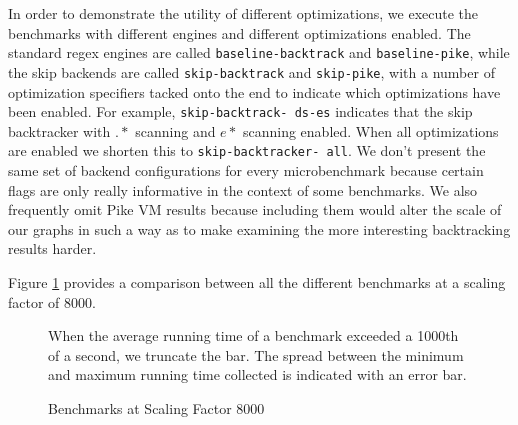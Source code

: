In order to demonstrate the utility of different optimizations,
we execute the benchmarks with different engines and different
optimizations enabled. The standard regex engines are called
\texttt{baseline\allowbreak -\allowbreak backtrack} and
\texttt{baseline\allowbreak -\allowbreak pike}, while the
skip backends are called \texttt{skip\allowbreak -\allowbreak backtrack}
and \texttt{skip\allowbreak -\allowbreak pike},
with a number of optimization specifiers tacked onto the end to
indicate which optimizations have been enabled. For example,
\texttt{skip\allowbreak -\allowbreak backtrack\allowbreak -\allowbreak
        ds\allowbreak -\allowbreak es}
indicates that the skip backtracker with $.*$ scanning and $e*$ scanning
enabled. When all optimizations are enabled we shorten this to
\texttt{skip\allowbreak -\allowbreak backtracker\allowbreak -\allowbreak
all}. We don't present the same set of backend configurations for
every microbenchmark because certain flags are only really informative
in the context of some benchmarks. We also frequently omit Pike VM
results because including them would alter the scale of our
graphs in such a way as to make examining the more interesting
backtracking results harder.

Figure \ref{fig:8000:all} provides a comparison between all the
different benchmarks at a scaling factor of 8000.

\begin{figure}
\caption{Benchmarks at Scaling Factor 8000}
\label{fig:8000:all}

When the average running time of a benchmark exceeded a
1000th of a second, we truncate the bar. The spread between
the minimum and maximum running time collected is indicated
with an error bar.

\end{figure}

